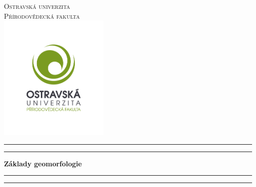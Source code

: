 

\thispagestyle{empty}	
\begin{center} %
	
	\vspace*{5ex}
	\textsc{\LARGE Ostravská univerzita}\\[0.5cm] %
	
	\textsc{\Large Přírodovědecká fakulta}\\[1cm] %
	
	\includegraphics[width=0.4\textwidth]{obrazky/logo/logo_cze.png}\\
	
	
	\rule{\textwidth}{1.6pt}\vspace*{-\baselineskip}\vspace*{2pt} %
	\rule{\textwidth}{0.4pt} %

	\vspace{0.75\baselineskip} %
	
	{\huge\bfseries Základy geomorfologie}\\[0.4cm] %
	
	\rule{\textwidth}{0.4pt}\vspace*{-\baselineskip}\vspace{3.2pt} %
	\rule{\textwidth}{1.6pt} %

	\vspace{2\baselineskip} %


\end{center}
